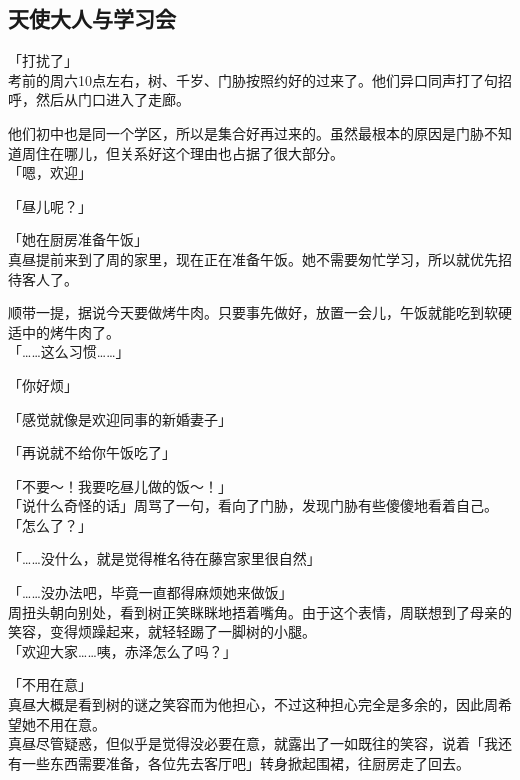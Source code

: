 \subsection{天使大人与学习会}

「打扰了」\\

考前的周六10点左右，树、千岁、门胁按照约好的过来了。他们异口同声打了句招呼，然后从门口进入了走廊。

他们初中也是同一个学区，所以是集合好再过来的。虽然最根本的原因是门胁不知道周住在哪儿，但关系好这个理由也占据了很大部分。\\

「嗯，欢迎」

「昼儿呢？」

「她在厨房准备午饭」\\

真昼提前来到了周的家里，现在正在准备午饭。她不需要匆忙学习，所以就优先招待客人了。

顺带一提，据说今天要做烤牛肉。只要事先做好，放置一会儿，午饭就能吃到软硬适中的烤牛肉了。\\

「……这么习惯……」

「你好烦」

「感觉就像是欢迎同事的新婚妻子」

「再说就不给你午饭吃了」

「不要～！我要吃昼儿做的饭～！」\\

「说什么奇怪的话」周骂了一句，看向了门胁，发现门胁有些傻傻地看着自己。\\

「怎么了？」

「……没什么，就是觉得椎名待在藤宫家里很自然」

「……没办法吧，毕竟一直都得麻烦她来做饭」\\

周扭头朝向别处，看到树正笑眯眯地捂着嘴角。由于这个表情，周联想到了母亲的笑容，变得烦躁起来，就轻轻踢了一脚树的小腿。\\

「欢迎大家……咦，赤泽怎么了吗？」

「不用在意」\\

真昼大概是看到树的谜之笑容而为他担心，不过这种担心完全是多余的，因此周希望她不用在意。\\

真昼尽管疑惑，但似乎是觉得没必要在意，就露出了一如既往的笑容，说着「我还有一些东西需要准备，各位先去客厅吧」转身掀起围裙，往厨房走了回去。

